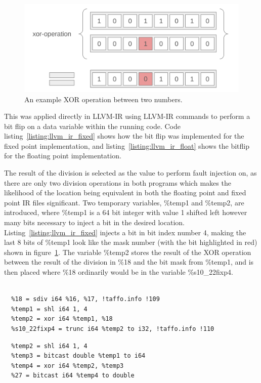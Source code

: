 \begin{figure}[h!]
    \centering
    \includegraphics[width=0.5\linewidth]{Images/xor_operation.png}
    \caption{An example XOR operation between two numbers.}
    \label{fig:xor_operation}
\end{figure}

This was applied directly in LLVM-IR using LLVM-IR commands to perform a bit flip on a data variable within the running code. Code listing~\ref{listing:llvm_ir_fixed} shows how the bit flip was implemented for the fixed point implementation, and listing~\ref{listing:llvm_ir_float} shows the bitflip for the floating point implementation.



The result of the division is selected as the value to perform fault injection on, as there are only two division operations in both programs which makes the likelihood of the location being equivalent in both the floating point and fixed point IR files significant.
Two temporary variables, \%temp1 and \%temp2, are introduced, where \%temp1 is a 64 bit integer with value 1 shifted left however many bits necessary to inject a bit in the desired location. Listing~\ref{listing:llvm_ir_fixed} injects a bit in bit index number 4, making the last 8 bits of \%temp1 look like the mask number (with the bit highlighted in red) shown in figure~\ref{fig:xor_operation}.
The variable \%temp2 stores the result of the XOR operation between the result of the division in \%18 and the bit mask from \%temp1, and is then placed where \%18 ordinarily would be in the variable \%s10\_22fixp4.

\begin{lstlisting}[caption=fixed point bit flip in llvm-ir, label=listing:llvm_ir_fixed]

  %18 = sdiv i64 %16, %17, !taffo.info !109
  %temp1 = shl i64 1, 4
  %temp2 = xor i64 %temp1, %18
  %s10_22fixp4 = trunc i64 %temp2 to i32, !taffo.info !110
\end{lstlisting} 

\begin{lstlisting}[caption=floating point bit flip in llvm-ir, label=listing:llvm_ir_float]
  %temp1 = fdiv double %24, %26
  %temp2 = shl i64 1, 4
  %temp3 = bitcast double %temp1 to i64
  %temp4 = xor i64 %temp2, %temp3
  %27 = bitcast i64 %temp4 to double
\end{lstlisting}


